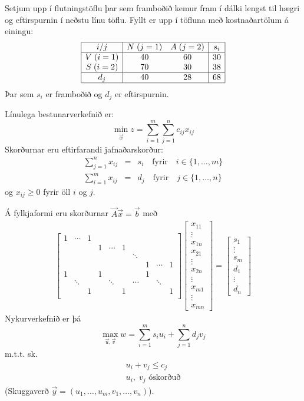 \begin{lausn}
Setjum upp í flutningstöflu þar sem framboðið kemur fram í dálki lengst til hægri og eftirspurnin í neðstu línu töflu. Fyllt er upp í töfluna með kostnaðartölum á einingu:
\[\begin{array}{|c|cc|c|}\hline 
   i / j & N\;(j=1)& A\;(j=2) & s_i \\ \hline 
  V\;(i=1) & 40 & 60 & 30 \\
  S\;(i=2) & 70 & 30 & 38 \\ \hline 
 d_j & 40  & 28 & 68 \\ \hline 
  \end{array}
\]
Þar sem $s_i$ er framboðið og $d_j$ er eftirspurnin.
\end{lausn}
Línulega bestunarverkefnið er:
$$\min_{\vec{x}} z = \sum_{i=1}^m\sum_{j=1}^n c_{ij}x_{ij}$$
Skorðurnar eru eftirfarandi jafnaðarskorður:
\begin{eqnarray*}
\sum_{j=1}^n x_{ij} &=& s_i \quad\mbox{fyrir}\quad i\in\{1,\ldots,m\}\\
\sum_{i=1}^m x_{ij} &=& d_j \quad\mbox{fyrir}\quad j\in\{1,\ldots,n\}
\end{eqnarray*}
og $x_{ij}\ge 0$ fyrir öll $i$ og $j$.

Á fylkjaformi eru skorðurnar $\vec{A}\vec{x}=\vec{b}$ með 
\begin{eqnarray*}
\begin{bmatrix}
1 & \cdots & 1 \\ & & & 1 & \cdots & 1 \\ & & & & & & \ddots \\ & & & & & & & 1 & \cdots & 1 \\ 
1 & & & 1 & & & & 1 \\
& \ddots & & & \ddots & & \cdots & & \ddots \\
& & 1 & & & 1 & & & & 1\\
 \end{bmatrix} 
\begin{bmatrix}  x_{11} \\ \vdots \\ x_{1n} \\ x_{21} \\\vdots \\ x_{2n} \\ \vdots \\ x_{m1} \\\vdots \\ x_{mn} \end{bmatrix} 
=
\begin{bmatrix}  s_1 \\ \vdots \\ s_m \\ d_1 \\\vdots \\ d_n\end{bmatrix} 
\end{eqnarray*}
Nykurverkefnið er þá
$$\max_{\vec{u},\vec{v}} w=\sum_{i=1}^m s_iu_i+\sum_{j=1}^n d_jv_j $$
m.t.t. sk.
\begin{eqnarray*}
 u_i+v_j\leq c_j \\
 u_i,\;v_j \mbox{ óskorðuð}
\end{eqnarray*}
(Skuggaverð $\vec{y}=(u_1,\ldots,u_m,v_1,\ldots,v_n)$).


